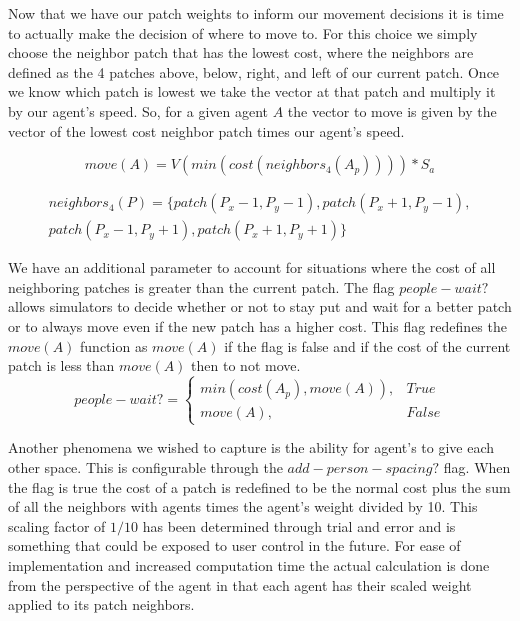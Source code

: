 \documentclass[12pt,letterpaper]{article}
\begin{document}
Now that we have our patch weights to inform our movement decisions it is time to actually make the decision of where to move to.  For this choice we simply choose the neighbor patch that has the lowest cost, where the neighbors are defined as the 4 patches above, below, right, and left of our current patch.  Once we know which patch is lowest we take the vector at that patch and multiply it by our agent's speed.  So, for a given agent $A$ the vector to move is given by the vector of the lowest cost neighbor patch times our agent's speed. 


\begin{equation}
move(A) = V( min(cost(neighbors_4 (A_p))) ) * S_a
\end{equation}

\begin{align}
neighbors_4 (P)  = \{patch(P_x - 1, P_y -1), patch(P_x + 1, P_y -1), \nonumber \\ 
patch(P_x - 1, P_y + 1),patch(P_x + 1, P_y + 1)\}   
\end{align}


We have an additional parameter to account for situations where the cost of all neighboring patches is greater than the current patch. The flag $people-wait?$ allows simulators to decide whether or not to stay put and wait for a better patch or to always move even if the new patch has a higher cost.  This flag redefines the $move(A)$ function as $move(A)$ if the flag is false and if the cost of the current patch is less than $move(A)$ then to not move.
\begin{equation}
people-wait?=
\begin{cases}
min(cost(A_p), move(A)), & True \\
move(A), & False
\end{cases}
\end{equation}

Another phenomena we wished to capture is the ability for agent's to give each other space.  This is configurable through the $add-person-spacing?$ flag.  When the flag is true the cost of a patch is redefined to be the normal cost plus the sum of all the neighbors with agents times the agent's weight divided by 10.  This scaling factor of $1/10$ has been determined through trial and error and is something that could be exposed to user control in the future.  For ease of implementation and increased computation time the actual calculation is done from the perspective of the agent in that each agent has their scaled weight applied to its patch neighbors.
\end{document}
